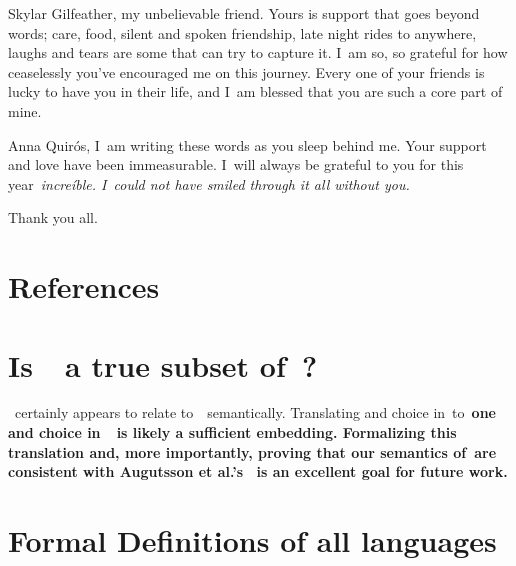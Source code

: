 \documentclass[manuscript,screen, 12pt, nonacm]{acmart}
\begin{document}
Skylar Gilfeather, my unbelievable friend. Yours is support that goes
beyond words; care, food, silent and spoken friendship, late night rides to
anywhere, laughs and tears are some that can try to capture it. I~am so, so
grateful for how ceaselessly you've encouraged me on this journey. Every one
of your friends is lucky to have you in their life, and I~am blessed that 
you are such a core part of mine. 

Anna Quirós, I~am writing these words as you sleep behind me. Your support
and love have been immeasurable. I~will always be grateful to you for this
year~\it{increíble}. I~could not have smiled through it all without you. 

Thank you all. 

\section{References}


\renewcommand\thesection{\Alph{section}}
\setcounter{section}{0}


\section{Is~\VMinus\ a true subset of~\VC?}
\VMinus\ certainly appears to relate to~\VC\ semantically. Translating
\iffibf and choice in~\VMinus to~\bf{one} and choice in~\VC\ is likely a
sufficient embedding. Formalizing this translation and, more importantly,
proving that our semantics of~\VMinus are consistent with Augutsson et al.'s
\VC\ is an excellent goal for future work. 

\section{Formal Definitions of all languages}
\label{languagedefs}
\end{document}
